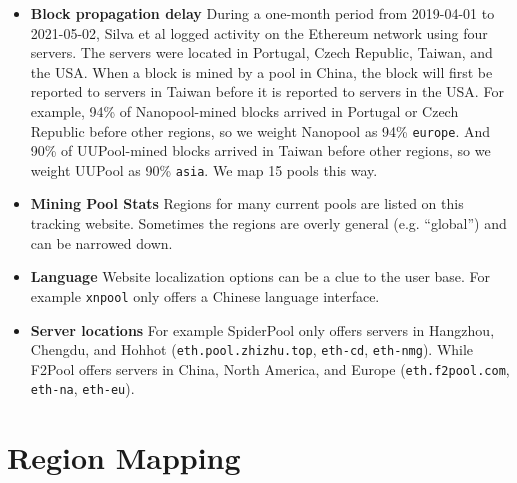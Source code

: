\begin{appendices}
\begin{itemize}
    \item \textbf{Block propagation delay} During a one-month period from 2019-04-01 to 2021-05-02, Silva et al\cite{silva_impact_2020} logged activity on the Ethereum network using four servers. The servers were located in Portugal, Czech Republic, Taiwan, and the USA. When a block is mined by a pool in China, the block will first be reported to servers in Taiwan before it is reported to servers in the USA. For example, 94\% of Nanopool-mined blocks arrived in Portugal or Czech Republic before other regions, so we weight Nanopool as 94\% \texttt{europe}. And 90\% of UUPool-mined blocks arrived in Taiwan before other regions, so we weight UUPool as 90\% \texttt{asia}. We map 15 pools this way.
    \item \textbf{Mining Pool Stats}\cite{miningpoolstats_ethereum_2021} Regions for many current pools are listed on this tracking website. Sometimes the regions are overly general (e.g. ``global'') and can be narrowed down.
    \item \textbf{Language} Website localization options can be a clue to the user base. For example \texttt{xnpool} only offers a Chinese language interface.
    \item \textbf{Server locations} For example SpiderPool only offers servers in Hangzhou, Chengdu, and Hohhot (\texttt{eth.pool.zhizhu.top}, \texttt{eth-cd}, \texttt{eth-nmg}). While F2Pool offers servers in China, North America, and Europe (\texttt{eth.f2pool.com},  \texttt{eth-na}, \texttt{eth-eu}).
\end{itemize}

\section{Region Mapping}
\label{appendix:region-mapping}

\newcommand{\diag}[1]{\multicolumn{1}{l}{\rlap{\rotatebox{60}{#1}~}}} 


\end{appendices}
